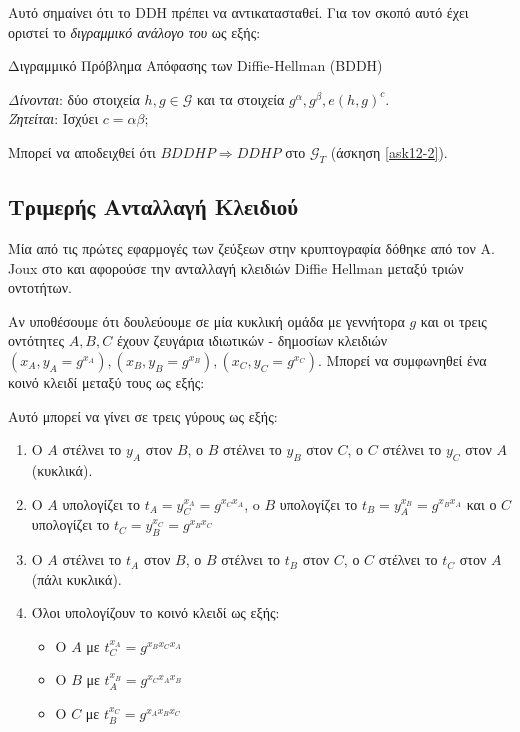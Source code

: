 Αυτό σημαίνει ότι το \gls{DDH} πρέπει να αντικατασταθεί. Για τον σκοπό αυτό έχει οριστεί το \emph{διγραμμικό ανάλογο του} ως εξής:
\begin{definition}{Διγραμμικό Πρόβλημα Απόφασης των Diffie-Hellman (\gls{BDDH})} 
\label{BDDHP}
\begin{center}
\emph{Δίνονται}: δύο στοιχεία $h,g \in \mathcal G$ και τα στοιχεία $g^\alpha, g^\beta,  e(h,g)^c$.\\
\emph{Ζητείται}: Ισχύει $c = \alpha \beta$;
\end{center}
\end{definition}

Μπορεί να αποδειχθεί ότι $BDDHP \Rightarrow DDHP$ στο $\mathcal G_T$ (άσκηση \ref{ask12-2}).


\subsection{Τριμερής Ανταλλαγή Κλειδιού}

Μία από τις πρώτες εφαρμογές των ζεύξεων στην κρυπτογραφία δόθηκε από τον A. Joux στο \cite{Joux00} και αφορούσε την ανταλλαγή κλειδιών Diffie Hellman μεταξύ τριών οντοτήτων. 

Αν υποθέσουμε ότι δουλεύουμε σε μία κυκλική ομάδα με γεννήτορα $g$ και οι τρεις οντότητες $A,B,C$ έχουν ζευγάρια ιδιωτικών - δημοσίων κλειδιών $(x_A, y_A=g^{x_A}),(x_B, y_B=g^{x_B}),(x_C, y_C=g^{x_C})$. Μπορεί να συμφωνηθεί ένα κοινό κλειδί μεταξύ τους ως εξής:

Αυτό μπορεί να γίνει σε τρεις γύρους ως εξής:
\begin{enumerate}
\item Ο $A$ στέλνει το $y_A$ στον $B$, ο $B$ στέλνει το $y_B$ στον $C$, ο $C$ στέλνει το $y_C$ στον $A$ (κυκλικά).
\item Ο $A$ υπολογίζει το $t_A = y_C^{x_A} = g^{x_Cx_A}$, o $B$ υπολογίζει το $t_B = y_A^{x_B} = g^{x_Bx_A}$ και ο $C$ υπολογίζει το $t_C = y_B^{x_C} = g^{x_Bx_C}$
\item Ο $A$ στέλνει το $t_A$ στον $B$, ο $B$ στέλνει το $t_B$ στον $C$, ο $C$ στέλνει το $t_C$ στον $A$ (πάλι κυκλικά).
\item Όλοι υπολογίζουν το κοινό κλειδί ως εξής:
\begin{itemize}
	\item Ο $A$ με $t_C ^ {x_A} = g^{x_Bx_Cx_A}$ 
	\item Ο $B$ με $t_A ^ {x_B} = g^{x_Cx_Ax_B}$
	\item Ο $C$ με $t_B ^ {x_C} = g^{x_Ax_Bx_C}$
\end{itemize}
\end{enumerate}

